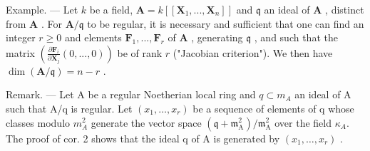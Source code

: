 Example. --- Let \(k\) be a field, \(\mathbf{A} = k[[\mathbf{X}_1, ..., \mathbf{X}_n]]\) and \(\mathfrak{q}\) an ideal of \(\mathbf{A}\) , distinct from \(\mathbf{A}\) . For \(\mathbf{A}/\mathfrak{q}\) to be regular, it is necessary and sufficient that one can find an integer \(r \geqslant 0\) and elements \(\mathbf{F}_1, ..., \mathbf{F}_r\) of \(\mathbf{A}\) , generating \(\mathfrak{q}\) , and such that the matrix \(\left(\frac{\partial\mathbf{F}_i}{\partial\mathbf{X}_j}(0, ..., 0)\right)\) be of rank \(r\) ("Jacobian criterion"). We then have \(\dim(\mathbf{A}/\mathfrak{q}) = n - r\) .

Remark. --- Let A be a regular Noetherian local ring and \(q \subset m_{A}\) an ideal of A such that A/q is regular. Let \((x_{1}, \ldots, x_{r})\) be a sequence of elements of q whose classes modulo \(m_{A}^{2}\) generate the vector space \((\mathfrak{q} + \mathfrak{m}_{\mathrm{A}}^{2}) / \mathfrak{m}_{\mathrm{A}}^{2}\) over the field \(\kappa_{A}\). The proof of cor. 2 shows that the ideal q of A is generated by \((x_{1}, \ldots, x_{r})\) .

